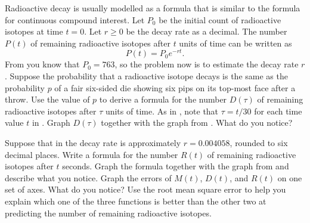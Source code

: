 \documentclass[a4paper,oneside,12pt]{article}
\begin{document}
\begin{problem}
\begin{packedenum}
  \item\label{subprob:aluminium_exponential_dice}
    Radioactive decay is usually modelled as a formula that is
    similar to the formula for continuous compound interest.  Let
    $P_0$ be the initial count of radioactive isotopes at time
    $t = 0$.  Let $r \geq 0$ be the decay rate as a decimal.  The
    number $P(t)$ of remaining radioactive isotopes after $t$ units of
    time can be written as
    \begin{equation}
    \label{eqn:aluminium_exponential_model_e}
    P(t)
    =
    P_0 e^{-rt}.
    \end{equation}
    From  you know that
    $P_0 = 763$, so the problem now is to estimate the decay rate
    $r$.  Suppose the probability that a radioactive isotope decays is
    the same as the probability $p$ of a fair six-sided die showing
    six pips on its top-most face after a throw.  Use the value of $p$
    to derive a formula for the number $D(\tau)$ of remaining
    radioactive isotopes after $\tau$ units of time.  As
    in , note that
    $\tau = t / 30$ for each time value $t$ in
    .  Graph $D(\tau)$ together
    with the graph from .
    What do you notice?

  \item\label{subprob:aluminium_mean_decay_rate}
    Suppose that in  the
    decay rate is approximately $r = 0.004058$, rounded to six decimal
    places.  Write a formula for the number $R(t)$ of remaining
    radioactive isotopes after $t$ seconds.  Graph the formula
    together with the graph
    from  and describe what
    you notice.  Graph the errors of $M(t)$, $D(t)$, and $R(t)$ on one
    set of axes.  What do you notice?  Use the root mean square error
    to help you explain which one of the three functions is better
    than the other two at predicting the number of remaining
    radioactive isotopes.
  \end{packedenum}
\end{problem}
\end{document}
